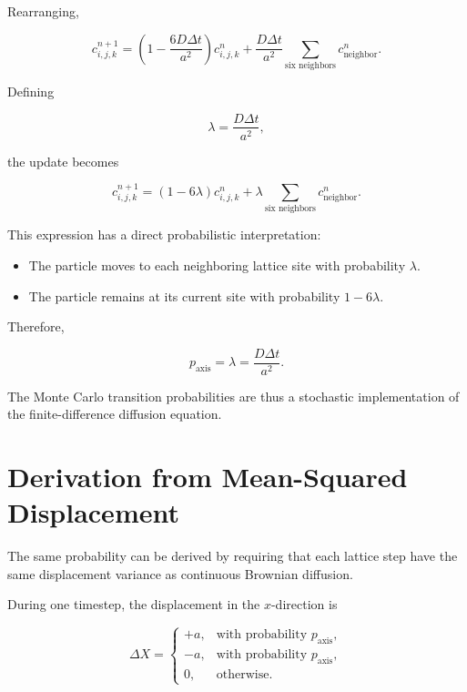 \documentclass[11pt]{article}
\begin{document}
Rearranging,

\begin{equation}
    c_{i,j,k}^{n+1}
    =
    \left(
        1-\frac{6D\Delta t}{a^2}
    \right)
    c_{i,j,k}^{n}
    +
    \frac{D\Delta t}{a^2}
    \sum_{\text{six neighbors}}
    c_{\mathrm{neighbor}}^{n}.
\end{equation}

Defining

\begin{equation}
    \lambda
    =
    \frac{D\Delta t}{a^2},
\end{equation}

the update becomes

\begin{equation}
    c_{i,j,k}^{n+1}
    =
    (1-6\lambda)c_{i,j,k}^{n}
    +
    \lambda
    \sum_{\text{six neighbors}}
    c_{\mathrm{neighbor}}^{n}.
\end{equation}

This expression has a direct probabilistic interpretation:

\begin{itemize}
    \item The particle moves to each neighboring lattice site with probability
    \(\lambda\).
    \item The particle remains at its current site with probability
    \(1-6\lambda\).
\end{itemize}

Therefore,

\begin{equation}
    p_{\mathrm{axis}}
    =
    \lambda
    =
    \frac{D\Delta t}{a^2}.
\end{equation}

The Monte Carlo transition probabilities are thus a stochastic implementation of the finite-difference diffusion equation.

\section{Derivation from Mean-Squared Displacement}

The same probability can be derived by requiring that each lattice step have the same displacement variance as continuous Brownian diffusion.

During one timestep, the displacement in the \(x\)-direction is

\begin{equation}
    \Delta X
    =
    \begin{cases}
        +a, & \text{with probability }p_{\mathrm{axis}},\\
        -a, & \text{with probability }p_{\mathrm{axis}},\\
        0,  & \text{otherwise}.
    \end{cases}
\end{equation}
\end{document}
